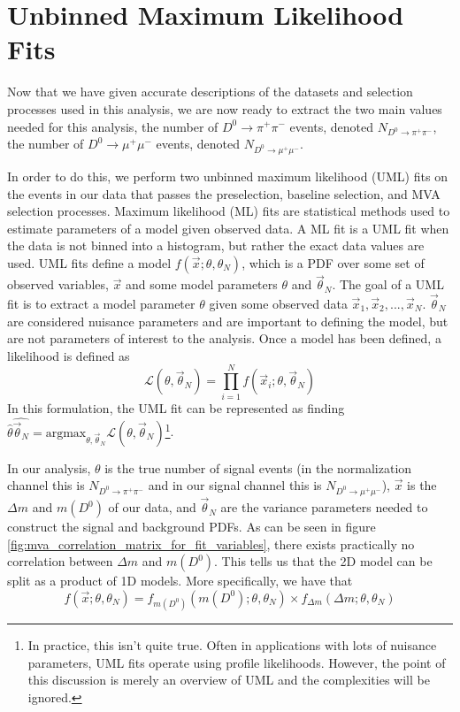 \section{Unbinned Maximum Likelihood Fits}
\label{sec:UML}

Now that we have given accurate descriptions of the datasets and selection processes used in this analysis, we are now ready to extract the two main values needed for this analysis, the number of $D^0 \to \pi^+ \pi^-$ events, denoted $N_{D^0 \to \pi^+ \pi^-}$, the number of $D^0 \to \mu^+ \mu^-$ events, denoted $N_{D^0 \to \mu^+ \mu^-}$.

In order to do this, we perform two unbinned maximum likelihood (UML) fits on the events in our data that passes the preselection, baseline selection, and MVA selection processes. Maximum likelihood (ML) fits are statistical methods used to estimate parameters of a model given observed data. A ML fit is a UML fit when the data is not binned into a histogram, but rather the exact data values are used. UML fits define a model $f(\vec{x}; \theta, \theta_N)$, which is a PDF over some set of observed variables, $\vec{x}$ and some model parameters $\theta$ and $\vec{\theta}_N$. The goal of a UML fit is to extract a model parameter $\theta$ given some observed data $\vec{x}_1, \vec{x}_2,...,\vec{x}_N$. $\vec{\theta}_N$ are considered nuisance parameters and are important to defining the model, but are not parameters of interest to the analysis. Once a model has been defined, a likelihood is defined as
\begin{equation}
    \mathcal{L}(\theta, \vec{\theta}_N) = \prod^N_{i=1} f(\vec{x}_i; \theta, \vec{\theta}_N)
\end{equation}
In this formulation, the UML fit can be represented as finding $\hat{\theta} \hat{\vec{\theta}_N}= \text{argmax}_{\theta, \vec{\theta}_N} \mathcal{L}(\theta, \vec{\theta}_N)$\footnote{In practice, this isn't quite true. Often in applications with lots of nuisance parameters, UML fits operate using profile likelihoods. However, the point of this discussion is merely an overview of UML and the complexities will be ignored.}. 

In our analysis, $\theta$ is the true number of signal events (in the normalization channel this is $N_{D^0 \to \pi^+ \pi^-}$ and in our signal channel this is $N_{D^0 \to \mu^+ \mu^-}$), $\vec{x}$ is the $\Delta m$ and $m(D^0)$ of our data, and $\vec{\theta}_N$ are the variance parameters needed to construct the signal and background PDFs. As can be seen in figure \ref{fig:mva_correlation_matrix_for_fit_variables}, there exists practically no correlation between $\Delta m$ and $m(D^0)$. This tells us that the 2D model can be split as a product of 1D models. More specifically, we have that
\begin{equation}
    f(\vec{x}; \theta, \theta_N) = f_{m(D^0)}(m(D^0); \theta, \theta_N) \times f_{\Delta m}(\Delta m; \theta, \theta_N)
\end{equation}


